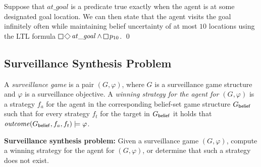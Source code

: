 \begin{example}
Suppose that $\mathit{at\_goal}$ is a predicate true exactly when the agent is at some designated goal location. We can then state that the agent visits the goal infinitely often while maintaining belief uncertainty of at most $10$ locations using the LTL formula $\LTLglobally\LTLfinally \mathit{at\_goal} \wedge \LTLglobally p_{10}$.
\qed
\end{example}

\subsection{Surveillance Synthesis Problem}
A \emph{surveillance game} is a pair $(G,\varphi)$, where $G$ is a surveillance game structure and $\varphi$ is a surveillance objective. A \emph{winning strategy for the agent for $(G,\varphi)$} is a strategy $f_a$ for the agent in the corresponding belief-set game structure $G_{\mathsf{belief}}$ such that for every strategy $f_t$ for the target in $G_{\mathsf{belief}}$ it holds that $\mathit{outcome}(G_{\mathsf{belief}},f_a,f_t) \models \varphi$.

{\bf Surveillance synthesis problem:} Given a surveillance game $(G,\varphi)$, compute a winning strategy for the agent for $(G,\varphi)$, or determine that such a strategy does not exist.

